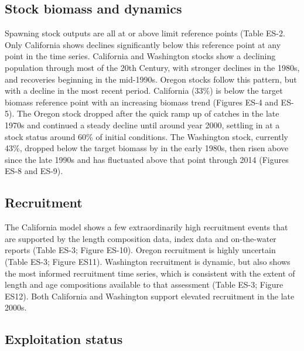 \documentclass[11pt,
  english,
  letterpaper,
]{article}
\begin{document}
\hypertarget{stock-biomass-and-dynamics}{%
\subsection*{Stock biomass and dynamics}\label{stock-biomass-and-dynamics}}

Spawning stock outputs are all at or above limit reference points (Table ES-2. Only California shows declines significantly below this reference point at any point in the time series. California and Washington stocks show a declining population through most of the 20th Century, with stronger declines in the 1980s, and recoveries beginning in the mid-1990s. Oregon stocks follow this pattern, but with a decline in the most recent period. California (33\%) is below the target biomass reference point with an increasing biomass trend (Figures ES-4 and ES-5). The Oregon stock dropped after the quick ramp up of catches in the late 1970s and continued a steady decline until around year 2000, settling in at a stock status around 60\% of initial conditions. The Washington stock, currently 43\%, dropped below the target biomass by in the early 1980s, then risen above since the late 1990s and has fluctuated above that point through 2014 (Figures ES-8 and ES-9).

\hypertarget{recruitment}{%
\subsection*{Recruitment}\label{recruitment}}

The California model shows a few extraordinarily high recruitment events that are supported by the length composition data, index data and on-the-water reports (Table ES-3; Figure ES-10). Oregon recruitment is highly uncertain (Table ES-3; Figure ES11). Washington recruitment is dynamic, but also shows the most informed recruitment time series, which is consistent with the extent of length and age compositions available to that assessment (Table ES-3; Figure ES12). Both California and Washington support elevated recruitment in the late 2000s.

\hypertarget{exploitation-status}{%
\subsection*{Exploitation status}\label{exploitation-status}}
\end{document}
